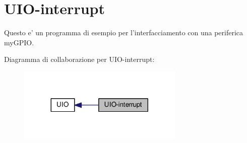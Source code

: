 \hypertarget{group___u_i_o-interrupt}{\section{U\+I\+O-\/interrupt}
\label{group___u_i_o-interrupt}
}


Questo e' un programma di esempio per l'interfacciamento con una periferica my\+G\+P\+I\+O.  


Diagramma di collaborazione per U\+I\+O-\/interrupt\+:\nopagebreak
\begin{figure}[H]
\begin{center}
\leavevmode
\includegraphics[width=224pt]{group___u_i_o-interrupt}
\end{center}
\end{figure}
